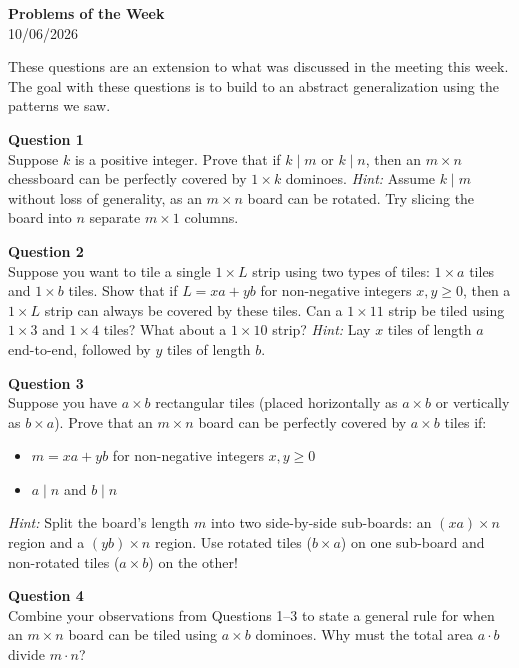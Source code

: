 \documentclass{article}
\begin{document}
\begin{center}
{\Large \textbf{Problems of the Week}} \\ 10/06/2026
\end{center}

These questions are an extension to what was discussed in the meeting this week. The goal with these questions is to build to an abstract generalization using the patterns we saw.

\textbf{Question 1} \\
Suppose $k$ is a positive integer. Prove that if $k \mid m$ or $k \mid n$, then an $m \times n$ chessboard can be perfectly covered by $1 \times k$ dominoes.
\textit{Hint:} Assume $k \mid m$ without loss of generality, as an $m \times n$ board can be rotated. Try slicing the board into $n$ separate $m \times 1$ columns.

\textbf{Question 2} \\
Suppose you want to tile a single $1 \times L$ strip using two types of tiles: $1 \times a$ tiles and $1 \times b$ tiles. Show that if $L = xa + yb$ for non-negative integers $x, y \ge 0$, then a $1 \times L$ strip can always be covered by these tiles.
Can a $1 \times 11$ strip be tiled using $1 \times 3$ and $1 \times 4$ tiles? What about a $1 \times 10$ strip?
\textit{Hint:} Lay $x$ tiles of length $a$ end-to-end, followed by $y$ tiles of length $b$.

\textbf{Question 3} \\
Suppose you have $a \times b$ rectangular tiles (placed horizontally as $a \times b$ or vertically as $b \times a$). Prove that an $m \times n$ board can be perfectly covered by $a \times b$ tiles if:
\begin{itemize}
    \item $m = xa + yb$ for non-negative integers $x, y \ge 0$
    \item $a \mid n$ and $b \mid n$
\end{itemize}
\textit{Hint:} Split the board's length $m$ into two side-by-side sub-boards: an $(xa) \times n$ region and a $(yb) \times n$ region. Use rotated tiles ($b \times a$) on one sub-board and non-rotated tiles ($a \times b$) on the other!

\textbf{Question 4} \\
Combine your observations from Questions 1--3 to state a general rule for when an $m \times n$ board can be tiled using $a \times b$ dominoes. Why must the total area $a \cdot b$ divide $m \cdot n$?
\end{document}
